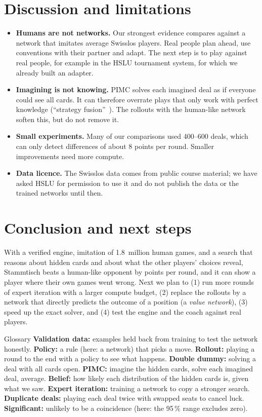 \documentclass[10pt,a4paper]{article}
\begin{document}
\section{Discussion and limitations}
\begin{itemize}
\item \textbf{Humans are not networks.} Our strongest evidence compares against a network that imitates average
  Swisslos players. Real people plan ahead, use conventions with their partner and adapt. The next step is to play
  against real people, for example in the HSLU tournament system, for which we already built an adapter.
\item \textbf{Imagining is not knowing.} PIMC solves each imagined deal as if everyone could see all cards. It can
  therefore overrate plays that only work with perfect knowledge (``strategy fusion''~\cite{long}). The rollouts with
  the human-like network soften this, but do not remove it.
\item \textbf{Small experiments.} Many of our comparisons used 400--600 deals, which can only detect differences of
  about 8 points per round. Smaller improvements need more compute.
\item \textbf{Data licence.} The Swisslos data comes from public course material; we have asked HSLU for permission to
  use it and do not publish the data or the trained networks until then.
\end{itemize}

\section{Conclusion and next steps}
With a verified engine, imitation of 1.8~million human games, and a search that reasons about hidden cards and about
what the other players' choices reveal, Stammtisch beats a human-like opponent by \SearchVsNet{} points per round, and
it can show a player where their own games went wrong. Next we plan to (1) run more rounds of expert iteration with a
larger compute budget, (2) replace the rollouts by a network that directly predicts the outcome of a position (a
\emph{value network}), (3) speed up the exact solver, and (4) test the engine and the coach against real players.

\begin{plain}{Glossary}
\textbf{Validation data:} examples held back from training to test the network honestly. \enspace
\textbf{Policy:} a rule (here: a network) that picks a move. \enspace
\textbf{Rollout:} playing a round to the end with a policy to see what happens. \enspace
\textbf{Double dummy:} solving a deal with all cards open. \enspace
\textbf{PIMC:} imagine the hidden cards, solve each imagined deal, average. \enspace
\textbf{Belief:} how likely each distribution of the hidden cards is, given what we saw. \enspace
\textbf{Expert iteration:} training a network to copy a stronger search. \enspace
\textbf{Duplicate deals:} playing each deal twice with swapped seats to cancel luck. \enspace
\textbf{Significant:} unlikely to be a coincidence (here: the 95\,\% range excludes zero).
\end{plain}
\end{document}
